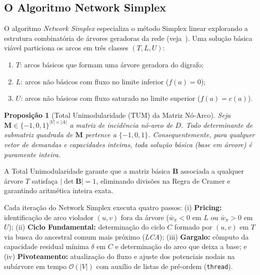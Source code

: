 \documentclass[12pt,a4paper]{article}
\newtheorem{prop}{Proposição}
\begin{document}
\subsection{O Algoritmo Network Simplex}

O algoritmo \textit{Network Simplex} especializa o método Simplex linear explorando a estrutura combinatória de árvores geradoras da rede (veja~\cite{ahuja1993network, dantzig1951application}). Uma solução básica viável particiona os arcos em três classes $(T, L, U)$:
\begin{enumerate}
    \item $T$: arcos básicos que formam uma árvore geradora do digrafo;
    \item $L$: arcos não básicos com fluxo no limite inferior ($f(a) = 0$);
    \item $U$: arcos não básicos com fluxo saturado no limite superior ($f(a) = c(a)$).
\end{enumerate}

\begin{prop}[Total Unimodularidade (TUM) da Matriz Nó-Arco]\label{prop:tum_rel}
Seja $\mathbf{M} \in \{-1, 0, 1\}^{|V| \times |A|}$ a matriz de incidência nó-arco de $D$. Todo determinante de submatriz quadrada de $\mathbf{M}$ pertence a $\{-1, 0, 1\}$. Consequentemente, para qualquer vetor de demandas e capacidades inteiras, toda solução básica (base em árvore) é puramente inteira.
\end{prop}

A Total Unimodularidade garante que a matriz básica $\mathbf{B}$ associada a qualquer árvore $T$ satisfaça $|\det \mathbf{B}| = 1$, eliminando divisões na Regra de Cramer e garantindo aritmética inteira exata.

Cada iteração do Network Simplex executa quatro passos: (i) \textbf{Pricing:} identificação de arco violador $(u, v)$ fora da árvore ($\bar{w}_\pi < 0$ em $L$ ou $\bar{w}_\pi > 0$ em $U$); (ii) \textbf{Ciclo Fundamental:} determinação do ciclo $C$ formado por $(u, v)$ em $T$ via busca do ancestral comum mais próximo (\textit{LCA}); (iii) \textbf{Gargalo:} cômputo da capacidade residual mínima $\delta$ em $C$ e determinação do arco que deixa a base; e (iv) \textbf{Pivoteamento:} atualização do fluxo e ajuste dos potenciais nodais na subárvore em tempo $\mathcal{O}(|V|)$ com auxílio de listas de pré-ordem (\lstinline{thread}).
\end{document}
